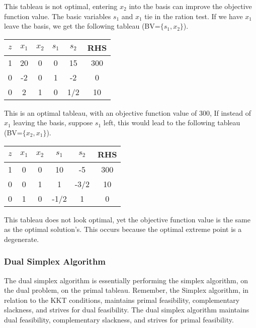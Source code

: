 This tableau is not optimal, entering $x_2$ into the basis can improve the objective function value. The basic variables $s_1$ and $x_1$ tie in the ration test.  If we have $x_1$ leave the basis, we get the following tableau (BV=$\{s_1, x_2\}$).
\begin{center} \begin{tabular} {|c|c|c|c|c||c|}
\hline
$z$ & $x_1$ & $x_2$ & $s_1$ & $s_2$ & RHS \\
\hline
  1 &    20 &     0 &     0 &    15 & 300 \\
  0 &    -2 &     0 &     1 &    -2 &  0 \\
  0 &     2 &     1 &     0 &   1/2 &  10 \\ \hline
\end{tabular} \end{center}
This is an optimal tableau, with an objective function value of 300,  If instead of $x_1$ leaving the basis, suppose $s_1$ left, this would lead to the following tableau (BV=$\{x_2, x_1\}$).
\begin{center} \begin{tabular} {|c|c|c|c|c||c|} \hline
$z$ & $x_1$ & $x_2$ & $s_1$ & $s_2$ & RHS \\
\hline
  1 &     0 &     0 &    10 &    -5 & 300 \\
  0 &     0 &     1 &     1 &  -3/2 &  10 \\
  0 &     1 &     0 &  -1/2 &     1 &   0 \\ \hline
\end{tabular} \end{center}
This tableau does not look optimal, yet the objective function value is the same as the optimal solution's. This occurs because the optimal extreme point is a degenerate.%



\subsubsection{Dual Simplex Algorithm}
The dual simplex algorithm is essentially performing the simplex algorithm, on the dual problem, on the primal tableau. Remember, the Simplex algorithm, in relation to the KKT conditions, maintains primal feasibility, complementary slackness, and strives for dual feasibility. The dual simplex algorithm maintains dual feasibility, complementary slackness, and strives for primal feasibility. \\


